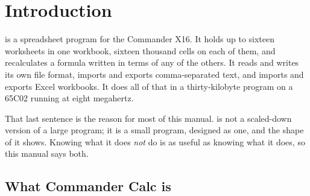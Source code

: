 \chapter{Introduction}
\label{ch:intro}

\ccprod{} is a spreadsheet program for the Commander X16. It holds up to
sixteen worksheets in one workbook, sixteen thousand cells on each of them,
and recalculates a formula written in terms of any of the others. It reads and
writes its own file format, imports and exports comma-separated text, and
imports and exports Excel  workbooks. It does all of that in a
thirty-kilobyte program on a 65C02 running at eight megahertz.

That last sentence is the reason for most of this manual. \ccprod{} is not a
scaled-down version of a large program; it is a small program, designed as one,
and the shape of it shows. Knowing what it does \emph{not} do is as useful as
knowing what it does, so this manual says both.

\section{What Commander Calc is}

